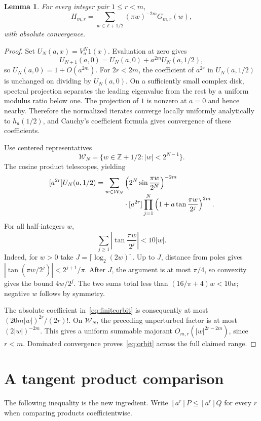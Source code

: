 \documentclass[11pt,a4paper]{article}
\newtheorem{lemma}[theorem]{Lemma}
\theoremstyle{remark}\newtheorem*{ednote}{Editorial note (ProveIt, 2026-10-01)}
\newcommand{\Z}{\mathbb Z}\newcommand{\E}{\mathcal E}\newcommand{\ii}{\mathrm i}
\begin{document}
\begin{lemma}\label{lem:orbit}
For every integer pair $1\le r<m$,
\begin{equation}\label{eq:orbit}
 H_{m,r}=\sum_{w\in\Z+1/2}(\pi w)^{-2m}G_{m,r}(w),
\end{equation}
with absolute convergence.
\end{lemma}
\begin{proof}
Set $U_N(a,x)=V_a^N1(x)$. Evaluation at zero gives
\[
 U_{N+1}(a,0)=U_N(a,0)+a^{2m}U_N(a,1/2),
\]
so $U_N(a,0)=1+O(a^{2m})$. For $2r<2m$, the coefficient of $a^{2r}$ in $U_N(a,1/2)$ is unchanged on dividing by $U_N(a,0)$. On a sufficiently small complex disk, spectral projection separates the leading eigenvalue from the rest by a uniform modulus ratio below one. The projection of $1$ is nonzero at $a=0$ and hence nearby. Therefore the normalized iterates converge locally uniformly analytically to $h_a(1/2)$, and Cauchy's coefficient formula gives convergence of these coefficients.

Use centered representatives
\[
 \mathcal W_N=\{w\in\Z+1/2:|w|<2^{N-1}\}.
\]
The cosine product telescopes, yielding
\begin{align}\label{eq:finiteorbit}
 [a^{2r}]U_N(a,1/2)
 =\sum_{w\in\mathcal W_N}&\left(2^N\sin\frac{\pi w}{2^N}\right)^{-2m}\notag\\[-2mm]
 &\cdot[a^{2r}]\prod_{j=1}^N
       \left(1+a\tan\frac{\pi w}{2^j}\right)^{2m}.
\end{align}
For all half-integers $w$,
\begin{equation}\label{eq:coarsebound}
 \sum_{j\ge1}\left|\tan\frac{\pi w}{2^j}\right|<10|w|.
\end{equation}
Indeed, for $w>0$ take $J=\lceil\log_2(2w)\rceil$. Up to $J$, distance from poles gives $|\tan(\pi w/2^j)|<2^{j+1}/\pi$. After $J$, the argument is at most $\pi/4$, so convexity gives the bound $4w/2^j$. The two sums total less than $(16/\pi+4)w<10w$; negative $w$ follows by symmetry.

The absolute coefficient in~\eqref{eq:finiteorbit} is consequently at most $(20m|w|)^{2r}/(2r)!$. On $\mathcal W_N$, the preceding unperturbed factor is at most $(2|w|)^{-2m}$. This gives a uniform summable majorant $O_{m,r}(|w|^{2r-2m})$, since $r<m$. Dominated convergence proves~\eqref{eq:orbit} across the full claimed range.
\end{proof}

\section{A tangent product comparison}
The following inequality is the new ingredient. Write $[a^r]P\le[a^r]Q$ for every $r$ when comparing products coefficientwise.
\end{document}
